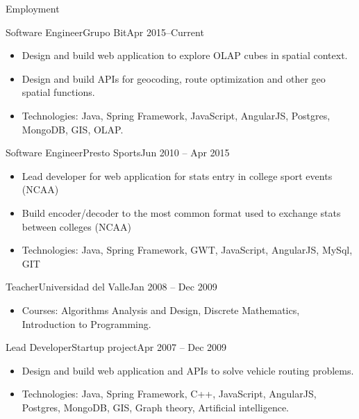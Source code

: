 \documentclass[]{mcdowellcv}
\begin{document}
	\makeheader
	
	\begin{cvsection}{Employment}
		\begin{cvsubsection}{Software Engineer}{Grupo Bit}{Apr 2015--Current}
			\begin{itemize}
				\item Design and build web application to explore OLAP cubes in spatial context.
				\item Design and build APIs for geocoding, route optimization and other geo spatial functions.
				\item Technologies: Java, Spring Framework, JavaScript, AngularJS, Postgres, MongoDB, GIS, OLAP.		 			
			\end{itemize}
		\end{cvsubsection}
		
		\begin{cvsubsection}{Software Engineer}{Presto Sports}{Jun 2010 -- Apr 2015}						
			\begin{itemize}
				\item Lead developer for web application for stats entry in college sport events (NCAA)
				\item Build encoder/decoder to the most common format used to exchange stats between colleges (NCAA)
				\item Technologies: Java, Spring Framework, GWT, JavaScript, AngularJS, MySql, GIT	
				
			\end{itemize}
		\end{cvsubsection}
%		
%		
		\begin{cvsubsection}{Teacher}{Universidad del Valle}{Jan 2008 -- Dec 2009}		
			\begin{itemize}
				\item Courses: Algorithms Analysis and Design, Discrete Mathematics, Introduction to Programming.			
			\end{itemize}
		\end{cvsubsection}
		
		\begin{cvsubsection}{Lead Developer}{Startup project}{Apr 2007 -- Dec 2009}		
			\begin{itemize}
				\item Design and build web application and APIs to solve vehicle routing problems.
				\item Technologies: Java, Spring Framework, C++, JavaScript, AngularJS, Postgres, MongoDB, GIS, Graph theory, Artificial intelligence. 	
			\end{itemize}
		\end{cvsubsection}
		

\end{cvsection}
\end{document}
